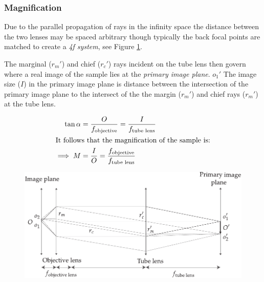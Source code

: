\subsubsection{Magnification}

Due to the parallel propagation of rays in the infinity space the distance between the two lenses may be spaced arbitrary though typically the back focal points are matched to create a \emph{4f system}, see Figure \ref{fig:magnification}.

The marginal ($r_m'$) and chief ($r_c'$) rays incident on the tube lens then govern where a real image of the sample lies at the \emph{primary image plane}. %
$o_1'$
The image size ($I$) in the primary image plane is distance between the intersection of the primary image plane to the intersect of the the margin ($r_m'$) and chief rays ($r_m'$) at the tube lens.

\begin{align}
    \tan \alpha &= \frac{O}{f_{\text{objective}}} =  \frac{I}{f_{\text{tube lens}}} \\
    \intertext{It follows that the magnification of the sample is:}
    \implies M &= \frac{I}{O} = \frac{f_{\text{objective}}}
{f_{\text{tube lens}}}
\end{align}

\begin{figure}
    \includegraphics{./magnification}
    \caption{}
    \label{fig:magnification}
\end{figure}





